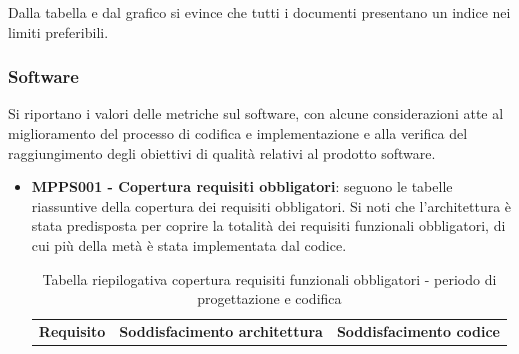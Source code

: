 \documentclass[openany,12pt,a4paper]{report}
\begin{document}
\begin{itemize}
	Dalla tabella e dal grafico si evince che tutti i documenti presentano un indice nei limiti preferibili.	
\end{itemize}

\subsubsection{Software}

Si riportano i valori delle metriche sul software, con alcune considerazioni atte al miglioramento del processo di codifica e implementazione e alla verifica del raggiungimento degli obiettivi di qualità relativi al prodotto software.

\begin{itemize}
	\item \textbf{MPPS001 - Copertura requisiti obbligatori}: seguono le tabelle riassuntive della copertura dei requisiti obbligatori. Si noti che l'architettura è stata predisposta per coprire la totalità dei requisiti funzionali obbligatori, di cui più della metà è stata implementata dal codice.
	
	\begin{longtable}{|p{40mm}|p{40mm}|p{40mm}|}
		\caption{Tabella riepilogativa copertura requisiti funzionali obbligatori - periodo di progettazione e codifica} \\
		\hline
		\centering \textbf{Requisito} & \textbf{Soddisfacimento architettura} &  \textbf{Soddisfacimento codice}\\
		

\end{longtable}
\end{itemize}
\end{document}
